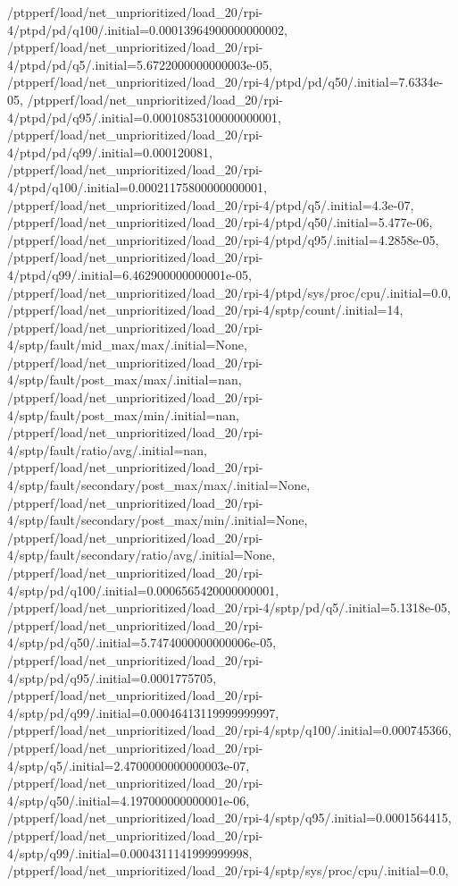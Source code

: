 {    /ptpperf/load/net_unprioritized/load_20/rpi-4/ptpd/pd/q100/.initial=0.00013964900000000002,
    /ptpperf/load/net_unprioritized/load_20/rpi-4/ptpd/pd/q5/.initial=5.6722000000000003e-05,
    /ptpperf/load/net_unprioritized/load_20/rpi-4/ptpd/pd/q50/.initial=7.6334e-05,
    /ptpperf/load/net_unprioritized/load_20/rpi-4/ptpd/pd/q95/.initial=0.00010853100000000001,
    /ptpperf/load/net_unprioritized/load_20/rpi-4/ptpd/pd/q99/.initial=0.000120081,
    /ptpperf/load/net_unprioritized/load_20/rpi-4/ptpd/q100/.initial=0.00021175800000000001,
    /ptpperf/load/net_unprioritized/load_20/rpi-4/ptpd/q5/.initial=4.3e-07,
    /ptpperf/load/net_unprioritized/load_20/rpi-4/ptpd/q50/.initial=5.477e-06,
    /ptpperf/load/net_unprioritized/load_20/rpi-4/ptpd/q95/.initial=4.2858e-05,
    /ptpperf/load/net_unprioritized/load_20/rpi-4/ptpd/q99/.initial=6.462900000000001e-05,
    /ptpperf/load/net_unprioritized/load_20/rpi-4/ptpd/sys/proc/cpu/.initial=0.0,
    /ptpperf/load/net_unprioritized/load_20/rpi-4/sptp/count/.initial=14,
    /ptpperf/load/net_unprioritized/load_20/rpi-4/sptp/fault/mid_max/max/.initial=None,
    /ptpperf/load/net_unprioritized/load_20/rpi-4/sptp/fault/post_max/max/.initial=nan,
    /ptpperf/load/net_unprioritized/load_20/rpi-4/sptp/fault/post_max/min/.initial=nan,
    /ptpperf/load/net_unprioritized/load_20/rpi-4/sptp/fault/ratio/avg/.initial=nan,
    /ptpperf/load/net_unprioritized/load_20/rpi-4/sptp/fault/secondary/post_max/max/.initial=None,
    /ptpperf/load/net_unprioritized/load_20/rpi-4/sptp/fault/secondary/post_max/min/.initial=None,
    /ptpperf/load/net_unprioritized/load_20/rpi-4/sptp/fault/secondary/ratio/avg/.initial=None,
    /ptpperf/load/net_unprioritized/load_20/rpi-4/sptp/pd/q100/.initial=0.0006565420000000001,
    /ptpperf/load/net_unprioritized/load_20/rpi-4/sptp/pd/q5/.initial=5.1318e-05,
    /ptpperf/load/net_unprioritized/load_20/rpi-4/sptp/pd/q50/.initial=5.7474000000000006e-05,
    /ptpperf/load/net_unprioritized/load_20/rpi-4/sptp/pd/q95/.initial=0.0001775705,
    /ptpperf/load/net_unprioritized/load_20/rpi-4/sptp/pd/q99/.initial=0.00046413119999999997,
    /ptpperf/load/net_unprioritized/load_20/rpi-4/sptp/q100/.initial=0.000745366,
    /ptpperf/load/net_unprioritized/load_20/rpi-4/sptp/q5/.initial=2.4700000000000003e-07,
    /ptpperf/load/net_unprioritized/load_20/rpi-4/sptp/q50/.initial=4.197000000000001e-06,
    /ptpperf/load/net_unprioritized/load_20/rpi-4/sptp/q95/.initial=0.0001564415,
    /ptpperf/load/net_unprioritized/load_20/rpi-4/sptp/q99/.initial=0.0004311141999999998,
    /ptpperf/load/net_unprioritized/load_20/rpi-4/sptp/sys/proc/cpu/.initial=0.0,
}
